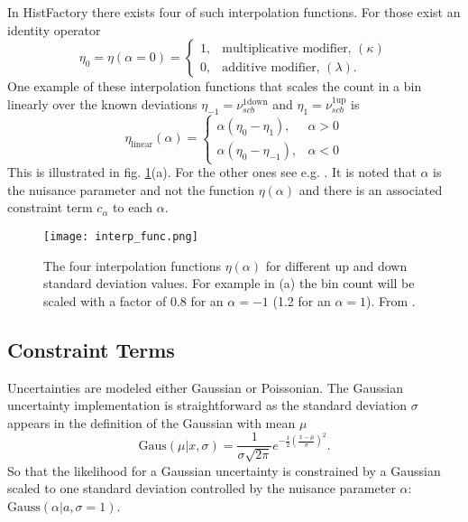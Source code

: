 In HistFactory there exists four of such interpolation functions. For those exist an identity operator
\begin{equation}
    \eta_0=\eta (\alpha=0) =
    \begin{cases}
        1 , & \text{multiplicative modifier, } (\kappa) \\
        0 , & \text{additive modifier, } (\lambda).
    \end{cases}
\end{equation}
One example of these interpolation functions that scales the count in a bin linearly over the known deviations $\eta_{-1}=\nu_{scb}^\mathrm{1down}$ and $\eta_{1}=\nu_{scb}^\mathrm{1up}$ is
\begin{equation}
    \eta_\mathrm{linear}(\alpha)=
    \begin{cases}
        \alpha(\eta_0 - \eta_1) ,    & \alpha>0 \\
        \alpha(\eta_0 - \eta_{-1}) , & \alpha<0
    \end{cases}
\end{equation}
This is illustrated in fig. \ref{fig:interp_func}(a). For the other ones see e.g. \citep{heinrich2019searches}. It is noted that $\alpha$ is the nuisance parameter and not the function $\eta(\alpha)$ and there is an associated constraint term $c_\alpha$ to each $\alpha$.
\begin{figure}
    \centering
    \texttt{[image: interp\_func.png]}
    \caption[]{The four interpolation functions $\eta(\alpha)$ for different up and down standard deviation values. For example in (a) the bin count will be scaled with a factor of 0.8 for an $\alpha=-1$ (1.2 for an $\alpha=1$). From \citep{cranmer2012histfactory}.}
    \label{fig:interp_func}
\end{figure}

\subsection{Constraint Terms}\label{sec:constraint_terms}
Uncertainties are modeled either Gaussian or Poissonian. The Gaussian uncertainty implementation is straightforward as the standard deviation $\sigma$ appears in the definition of the Gaussian with mean $\mu$
\begin{equation}
    \text{Gaus}(\mu|x,\sigma)=\frac{1}{\sigma\sqrt{2\pi}}e^{-\frac{1}{2}\left(\frac{x-\mu}{\sigma}\right)^2}.
\end{equation}
So that the likelihood for a Gaussian uncertainty is constrained by a Gaussian scaled to one standard deviation controlled by the nuisance parameter $\alpha$: \mbox{$\mathrm{Gauss}(\alpha | a, \sigma=1)$}.

